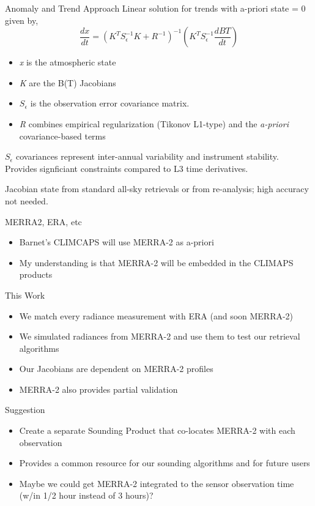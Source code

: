 \documentclass[10pt,t]{beamer}
\begin{document}
\begin{frame}[label={sec:org5dfe0c4}]{Anomaly and Trend Approach}
Linear solution for trends with a-priori state = 0 given by,
\begin{displaymath}
\frac{dx}{dt} =  \left(K^T S_{\epsilon}^{-1} K + R^{-1}\right)^{-1} \left(K^T S_{\epsilon}^{-1} \frac{dBT}{dt}\right)
\end{displaymath}

\begin{itemize}
\item \emph{x} is the atmospheric state
\item \emph{K} are the B(T) Jacobians
\item \(S_{\epsilon}\) is the observation error covariance matrix.
\item \emph{R} combines empirical regularization (Tikonov L1-type) and the \emph{a-priori} covariance-based terms
\end{itemize}

\(S_\epsilon\) covariances represent inter-annual variability and instrument stability.  Provides signficiant constraints compared to L3 time derivatives.

Jacobian state from standard all-sky retrievals or from re-analysis; high accuracy not needed.
\end{frame}

\begin{frame}[shrink=20,label={sec:org93c6f91}]{MERRA2, ERA, etc}
\begin{itemize}
\item Barnet's CLIMCAPS will use MERRA-2 as a-priori
\item My understanding is that MERRA-2 will be embedded in the CLIMAPS products
\end{itemize}

\begin{block}{This Work}
\begin{itemize}
\item We match every radiance measurement with ERA (and soon MERRA-2)
\item We simulated radiances from MERRA-2 and use them to test our retrieval algorithms
\item Our Jacobians are dependent on MERRA-2 profiles
\item MERRA-2 also provides partial validation
\end{itemize}
\end{block}

\begin{block}{Suggestion}
\begin{itemize}
\item Create a separate Sounding Product that co-locates MERRA-2 with each observation
\item Provides a common resource for our sounding algorithms and for future users
\item Maybe we could get MERRA-2 integrated to the sensor observation time (w/in 1/2 hour instead of 3 hours)?
\end{itemize}
\end{block}
\end{frame}
\end{document}
